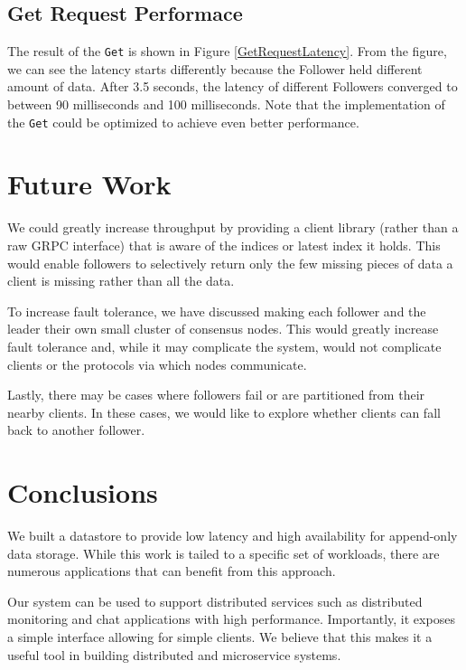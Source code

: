 \documentclass[11pt,english,twocolumn]{article}
\begin{document}
\subsection{Get Request Performace}
The result of the \texttt{Get} is shown in Figure \ref{GetRequestLatency}. From the figure, we can see the latency starts differently because the Follower held different amount of data. After 3.5 seconds, the latency of different Followers converged to between 90 milliseconds and 100 milliseconds. Note that the implementation of the \texttt{Get} could be optimized to achieve even better performance.

\vspace{-0.4cm}
\section{Future Work}
We could greatly increase throughput by providing a client library (rather than
a raw GRPC interface) that is aware of the indices or latest index it holds.
This would enable followers to selectively return only the few missing pieces of
data a client is missing rather than all the data.

To increase fault tolerance, we have discussed making each follower and the
leader their own small cluster of consensus nodes. This would greatly increase
fault tolerance and, while it may complicate the system, would not complicate
clients or the protocols via which nodes communicate.

Lastly, there may be cases where followers fail or are partitioned from their
nearby clients. In these cases, we would like to explore whether clients can
fall back to another follower.
\vspace{-0.3cm}
\section{Conclusions}
We built a datastore to provide low latency and high availability for append-only
data storage. While this work is tailed to a specific set of workloads, there
are numerous applications that can benefit from this approach.

Our system can be used to support distributed services such as distributed
monitoring and chat applications with high performance. Importantly, it exposes
a simple interface allowing for simple clients. We believe that this makes it a
useful tool in building distributed and microservice systems.
\vspace{-0.4cm}
 

\end{document}
